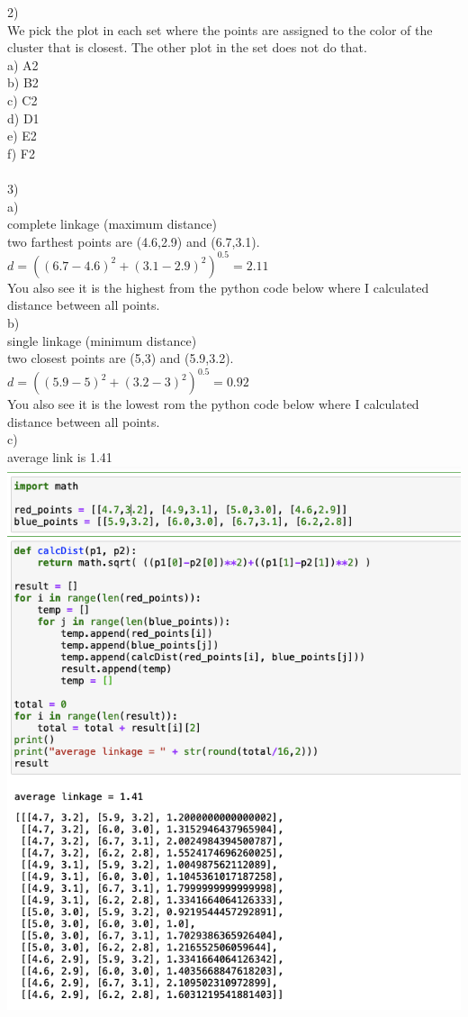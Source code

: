 \documentclass[11pt]{article}
\begin{document}
2) \\
We pick the plot in each set where the points are assigned to the color of the cluster that is closest. The other plot in the set does not do that. \\
a) A2 \\
b) B2 \\
c) C2 \\
d) D1 \\
e) E2 \\
f) F2 \\
\\
3) \\ 
a) \\
complete linkage (maximum distance) \\
two farthest points are (4.6,2.9) and (6.7,3.1). \\
$d = ((6.7-4.6)^2 + (3.1-2.9)^2 )^{0.5} = 2.11$ \\
You also see it is the highest from the python code below where I calculated distance between all points. \\

b) \\
single linkage (minimum distance) \\
two closest points are (5,3) and (5.9,3.2). \\
$d = ((5.9-5)^2 + (3.2-3)^2)^{0.5} = 0.92$ \\
You also see it is the lowest rom the python code below where I calculated distance between all points. \\

c) \\
average link is 1.41 \\
\includegraphics[scale=0.35]{img15} \\
\end{document}
